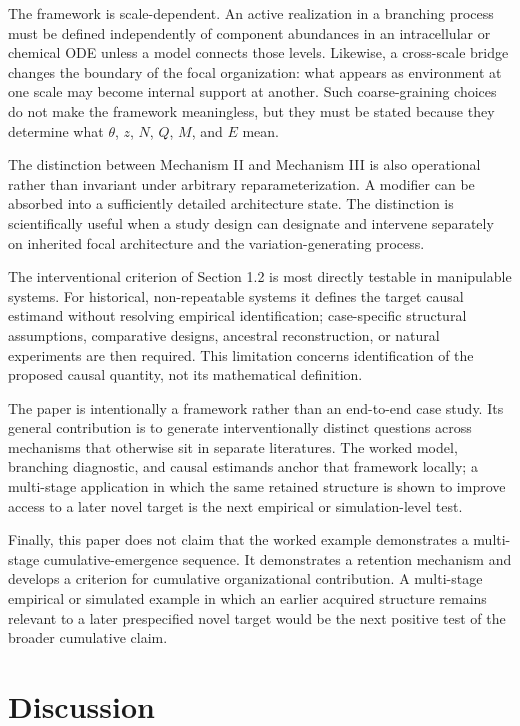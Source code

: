 \documentclass[11pt,a4paper]{article}
\begin{document}
The framework is scale-dependent. An active realization in a branching process must be defined independently of component abundances in an intracellular or chemical ODE unless a model connects those levels. Likewise, a cross-scale bridge changes the boundary of the focal organization: what appears as environment at one scale may become internal support at another. Such coarse-graining choices do not make the framework meaningless, but they must be stated because they determine what $\theta$, $z$, $N$, $Q$, $M$, and $E$ mean.

The distinction between Mechanism II and Mechanism III is also operational rather than invariant under arbitrary reparameterization. A modifier can be absorbed into a sufficiently detailed architecture state. The distinction is scientifically useful when a study design can designate and intervene separately on inherited focal architecture and the variation-generating process.

The interventional criterion of Section 1.2 is most directly testable in manipulable systems. For historical, non-repeatable systems it defines the target causal estimand without resolving empirical identification; case-specific structural assumptions, comparative designs, ancestral reconstruction, or natural experiments are then required. This limitation concerns identification of the proposed causal quantity, not its mathematical definition.

The paper is intentionally a framework rather than an end-to-end case study. Its general contribution is to generate interventionally distinct questions across mechanisms that otherwise sit in separate literatures. The worked model, branching diagnostic, and causal estimands anchor that framework locally; a multi-stage application in which the same retained structure is shown to improve access to a later novel target is the next empirical or simulation-level test.

Finally, this paper does not claim that the worked example demonstrates a multi-stage cumulative-emergence sequence. It demonstrates a retention mechanism and develops a criterion for cumulative organizational contribution. A multi-stage empirical or simulated example in which an earlier acquired structure remains relevant to a later prespecified novel target would be the next positive test of the broader cumulative claim.

\section{Discussion}
\end{document}
